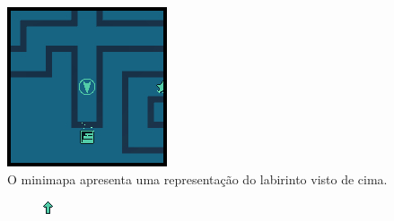 \documentclass[
	12pt,				%
	openright,			%
	twoside,			%
	a4paper,			%
	english,			%
	french,				%
	spanish,			%
	brazil				%
	]{abntex2}
\begin{document}
\begin{figure}[h!]
 \centering
  \includegraphics[width=0.4\linewidth]{minimap.jpg}
  \caption{O minimapa apresenta uma representação do labirinto visto de cima.}
  \label{fig:minimapa1}
\end{figure}

\begin{figure}[h!]
  \centering
  \begin{subfigure}[b]{0.1\linewidth}
    \includegraphics[width=\linewidth]{icon1.jpg}
  \end{subfigure}

\end{figure}
\end{document}
